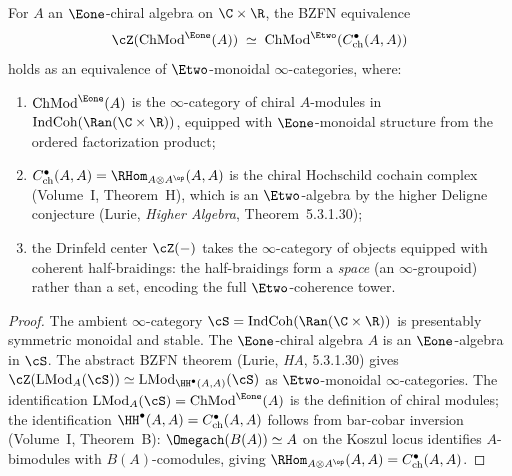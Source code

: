 \begin{proposition}
\label{prop:infty-cat-bzfn}
For $A$ an $\Eone$-chiral algebra on $\C \times \R$, the BZFN
equivalence
\begin{equation}
\label{eq:infty-cat-bzfn}
 \cZ(\mathrm{ChMod}^{\Eone}(A))
 \;\simeq\;
 \mathrm{ChMod}^{\Etwo}(C^\bullet_{\mathrm{ch}}(A, A))
\end{equation}
holds as an equivalence of $\Etwo$-monoidal $\infty$-categories,
where:
\begin{enumerate}[label=(\roman*)]
 \item $\mathrm{ChMod}^{\Eone}(A)$ is the $\infty$-category of
 chiral $A$-modules in $\mathrm{IndCoh}(\Ran(\C \times \R))$,
 equipped with $\Eone$-monoidal structure from the ordered
 factorization product;
 \item $C^\bullet_{\mathrm{ch}}(A, A) = \RHom_{A \otimes A^{\op}}(A, A)$
 is the chiral Hochschild cochain complex (Volume~I, Theorem~H),
 which is an $\Etwo$-algebra by the higher Deligne conjecture
 \textup{(}Lurie, \emph{Higher Algebra},
 Theorem~5.3.1.30\textup{)};
 \item the Drinfeld center $\cZ(-)$ takes the $\infty$-category
 of objects equipped with coherent half-braidings: the half-braidings
 form a \emph{space} (an $\infty$-groupoid) rather than a set,
 encoding the full $\Etwo$-coherence tower.
\end{enumerate}
\end{proposition}

\begin{proof}
The ambient $\infty$-category
$\cS = \mathrm{IndCoh}(\Ran(\C \times \R))$ is presentably
symmetric monoidal and stable. The $\Eone$-chiral algebra $A$ is
an $\Eone$-algebra in $\cS$. The abstract BZFN theorem
(Lurie, \emph{HA}, 5.3.1.30) gives
$\cZ(\mathrm{LMod}_A(\cS)) \simeq
\mathrm{LMod}_{\HH^\bullet(A,A)}(\cS)$
as $\Etwo$-monoidal $\infty$-categories. The identification
$\mathrm{LMod}_A(\cS) = \mathrm{ChMod}^{\Eone}(A)$ is the
definition of chiral modules; the identification
$\HH^\bullet(A, A) = C^\bullet_{\mathrm{ch}}(A, A)$ follows from
bar-cobar inversion (Volume~I, Theorem~B):
$\Omegach(B(A)) \simeq A$ on the Koszul locus identifies
$A$-bimodules with $B(A)$-comodules, giving
$\RHom_{A \otimes A^{\op}}(A, A) = C^\bullet_{\mathrm{ch}}(A, A)$.
\end{proof}

